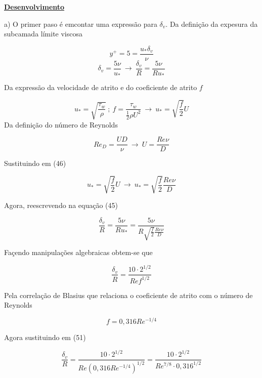 \documentclass[12pt]{article}
\begin{document}
\textbf{\underline{Desenvolvimento}}

a) O primer paso é emcontar uma expressão para $\delta_v$. Da definição da expesura da subcamada límite viscosa

\begin{equation}
	y^+ = 5 = \frac{u_*\delta_v}{\nu}
\end{equation}
\begin{equation}
	\delta_v = \frac{5\nu}{u_*} \ \rightarrow \ \frac{\delta_v}{R} = \frac{5\nu}{Ru_*}
\end{equation}

Da expressão da velocidade de atrito e do coeficiente de atrito $f$

\begin{equation}
	u_*=\sqrt{\frac{\tau_w}{\rho}} \ ; \ f = \frac{\tau_w}{\frac{1}{2}\rho U^2} \ \rightarrow \ u_*=\sqrt{\frac{f}{2}}U
\end{equation}
Da definição do número de Reynolds

\begin{equation}
	Re_D = \frac{UD}{\nu} \ \rightarrow \ U= \frac{Re \nu}{D}
\end{equation}

Sustituindo em (46)

\begin{equation}
	u_*=\sqrt{\frac{f}{2}}U \ \rightarrow \  u_*=\sqrt{\frac{f}{2}} \frac{Re \nu}{D}
\end{equation}

Agora, reescrevendo na equação (45)

\begin{equation}
	\frac{\delta_v}{R} = \frac{5\nu}{Ru_*} = \frac{5\nu}{R\sqrt{\frac{f}{2}} \frac{Re \nu}{D}}
\end{equation}

Façendo manipulações algebraicas obtem-se que

\begin{equation}
	\frac{\delta_v}{R} = \frac{10 \cdot 2^{1/2}}{Re f^{1/2}}
\end{equation}

Pela correlação de Blasius que relaciona o coeficiente de atrito com o número de Reynolds

\begin{equation}
	f = 0,316 Re^{-1/4}
\end{equation}

Agora sustituindo em (51)

\begin{equation}
	\frac{\delta_v}{R} = \frac{10 \cdot 2^{1/2}}{Re (0,316 Re^{-1/4})^{1/2}} = \frac{10 \cdot 2^{1/2}}{Re^{7/8} \cdot 0,316^{1/2}}
\end{equation}
\end{document}
